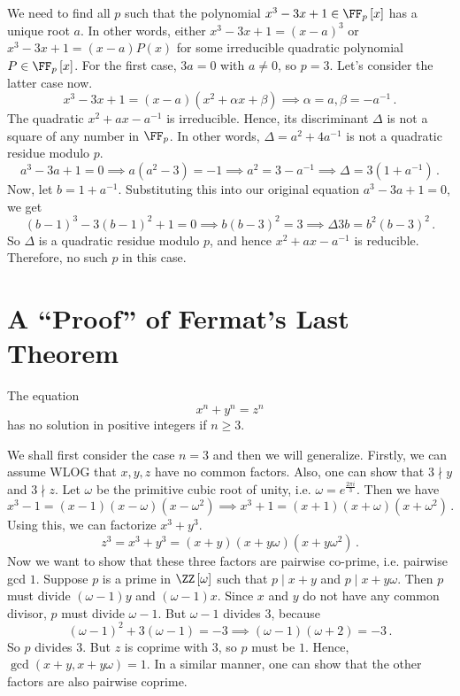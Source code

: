 \documentclass[11pt]{scrartcl}
\begin{document}
\begin{soln}
We need to find all \(p\) such that the polynomial \(x^3 - 3x +1 \in \FF_p \left[x\right] \) has a unique root \(a\). In other words, either \(x^3 - 3x +1 = \left(x-a\right) ^3\) or \(x^3 - 3x +1 = \left(x-a\right) P \left(x\right) \) for some irreducible quadratic polynomial \(P \in \FF_p \left[x\right] \). For the first case, \(3a = 0\) with \(a \ne 0\), so \(p = 3\). Let's consider the latter case now.
\[ x^3 - 3x +1 = \left(x-a\right) \left(x^2 + \alpha x + \beta \right) \implies \alpha=a, \beta =-a ^{-1}  \,. \]
The quadratic \(x^2 + ax - a ^{-1} \) is irreducible. Hence, its discriminant \(\Delta\) is not a square of any number in \(\FF_p\). In other words, \(\Delta = a^2 + 4 a ^{-1} \) is not a quadratic residue modulo \(p\).
\[ a^3 - 3a  + 1 = 0 \implies a \left(a^2 -3\right) = -1 \implies a^2 = 3 - a ^{-1} \implies \Delta = 3 \left(1+ a ^{-1} \right) \,. \]
Now, let \(b = 1+ a ^{-1} \). Substituting this into our original equation \(a^3 - 3a  + 1 = 0\), we get
\[ \left(b-1\right) ^3-3 \left(b-1\right) ^2 + 1 = 0 \implies b \left(b-3\right) ^2 = 3 \implies \Delta 3b = b^2 \left(b-3\right) ^2 \,.\]
So \(\Delta\) is a quadratic residue modulo \(p\), and hence \(x^2 + ax - a ^{-1} \) is reducible. Therefore, no such \(p\) in this case.
\end{soln}

\section{A ``Proof'' of Fermat's Last Theorem}
\begin{theorem}
The equation \[x^n+y^n=z^n\] has no solution in positive integers if \(n \ge 3\).
\end{theorem}
We shall first consider the case \(n=3\) and then we will generalize. Firstly, we can assume WLOG that \(x,y,z\) have no common factors. Also, one can show that \(3 \nmid y\) and \(3 \nmid z\). Let \(\omega\) be the primitive cubic root of unity, i.e. \(\omega = e^{\frac{2\pi i}{3}}\). Then we have
\[ x^3 - 1 = \left(x-1\right) \left(x-\omega\right) \left(x-\omega^2\right) \implies x^3 + 1 = \left(x+1\right) \left(x+\omega\right) \left(x+\omega^2\right) \,. \]
Using this, we can factorize \(x^3 + y^3\).
\[ z^3 = x^3+y^3=  \left(x+y\right) \left(x+y\omega\right) \left(x+y\omega^2\right) \,. \]
Now we want to show that these three factors are pairwise co-prime, i.e. pairwise gcd \(1\). Suppose \(p\) is a prime in \(\ZZ \left[\omega\right] \) such that \(p \mid x+y\) and \(p \mid x+y\omega\). Then \(p\) must divide \(\left(\omega-1\right) y\) and \(\left(\omega-1\right) x\). Since \(x\) and \(y\) do not have any common divisor, \(p\) must divide \(\omega -1\). But \(\omega - 1\) divides \(3\), because
\[ \left(\omega - 1\right) ^2 + 3 \left(\omega - 1\right) = -3 \implies \left(\omega - 1\right) \left(\omega +2\right) = -3 \,. \]
So \(p\) divides \(3\). But \(z\) is coprime with \(3\), so \(p\) must be \(1\). Hence, \(\gcd \left(x+y, x+y \omega\right) = 1 \). In a similar manner, one can show that the other factors are also pairwise coprime.
\end{document}

